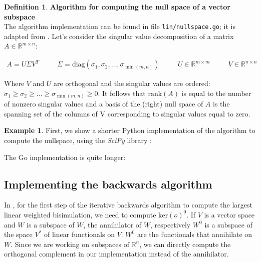 \documentclass{article}
\theoremstyle{plain}%
\theoremstyle{definition}
\newtheorem{defn}{Definition}[section]
\newtheorem{exmp}{Example}[section]
\theoremstyle{remark}
\def\R{\mathbb{R}}
\newcommand{\diag}[1]{\text{diag}\left(#1\right)}
\newcommand{\mker}[1]{\text{ker}\left(#1\right)}
\newcommand{\mrank}[1]{\text{rank}\left(#1\right)}
\begin{document}
\begin{defn}
  \textbf{Algorithm for computing the null space of a vector subspace} \\
  The algorithm implementation can be found in file \texttt{lin/nullspace.go}; it is
  adapted from \cite{scipy/ranknullspace}. 
  Let's consider the singular value decomposition of a matrix $A \in \R^{m \times n}$:

  \begin{equation*}
    \begin{aligned}
      A = U \Sigma V^T & \quad & \Sigma = \diag{\sigma_1, \sigma_2, \hdots, \sigma_{\min(m, n)}  } 
       & \quad &  U \in \R^{m \times m} & \quad & V \in \R^{n \times n}
    \end{aligned}
  \end{equation*}

  Where $V$ and $U$ are orthogonal and the singular values are ordered: $\sigma_1 \geq \sigma_2 \geq \hdots \geq \sigma_{\min(m,n)} \geq 0$.
  It follows that $\mrank{A}$ is equal to the number of nonzero singular values and
  a basis of the (right) null space of $A$ is the spanning set of the columns of V
  corresponding to singular values equal to zero. 
\end{defn}

\begin{exmp}
  First, we show a shorter Python 
  implementation of the algorithm to compute the nullspace, using the 
  \textit{SciPy} library \cite{scipy/ranknullspace}:

  

    The Go implementation is quite longer:

    

\end{exmp}



\subsection{Implementing the backwards algorithm}

In \cite{BONCHI201277}, for the first step of the iterative backwards 
algorithm to compute the largest linear weighted bisimulation, we 
need to compute $\mker{o}^0$. If $V$ is a vector space and $W$ is a
subspace of $W$, the annihilator of $W$, respectively $W^0$ is 
a subspace of the space $V^*$ of linear functionals on $V$.
$W^0$ are the functionals that annihilate on $W$. Since 
we are working on subspaces of $\R^n$, we can directly compute 
the orthogonal complement in our implementation instead of the
annihilator.
\end{document}
